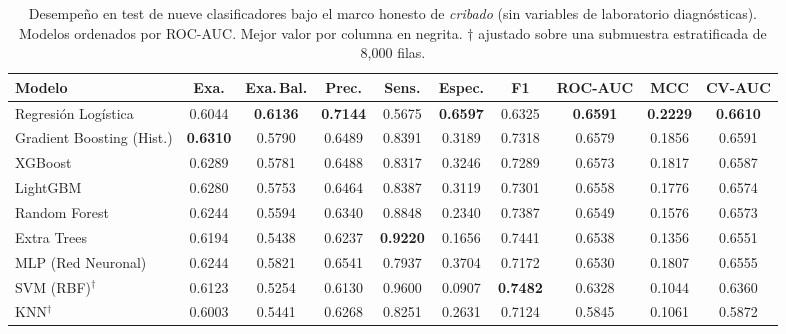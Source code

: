 \begin{table}[!t]
\renewcommand{\arraystretch}{1.25}
\caption{Desempeño en test de nueve clasificadores bajo el marco honesto de
\emph{cribado} (sin variables de laboratorio diagnósticas). Modelos ordenados
por ROC-AUC. Mejor valor por columna en negrita. $\dagger$ ajustado sobre una
submuestra estratificada de 8{,}000 filas.}
\label{tab:comparison}
\centering
\begin{tabular}{l c c c c c c c c c}
\toprule
\textbf{Modelo} & \textbf{Exa.} & \textbf{Exa.\,Bal.} & \textbf{Prec.} & \textbf{Sens.} & \textbf{Espec.} & \textbf{F1} & \textbf{ROC-AUC} & \textbf{MCC} & \textbf{CV-AUC} \\
\midrule
Regresión Logística        & 0.6044 & \textbf{0.6136} & \textbf{0.7144} & 0.5675 & \textbf{0.6597} & 0.6325 & \textbf{0.6591} & \textbf{0.2229} & \textbf{0.6610} \\
Gradient Boosting (Hist.)  & \textbf{0.6310} & 0.5790 & 0.6489 & 0.8391 & 0.3189 & 0.7318 & 0.6579 & 0.1856 & 0.6591 \\
XGBoost                    & 0.6289 & 0.5781 & 0.6488 & 0.8317 & 0.3246 & 0.7289 & 0.6573 & 0.1817 & 0.6587 \\
LightGBM                   & 0.6280 & 0.5753 & 0.6464 & 0.8387 & 0.3119 & 0.7301 & 0.6558 & 0.1776 & 0.6574 \\
Random Forest              & 0.6244 & 0.5594 & 0.6340 & 0.8848 & 0.2340 & 0.7387 & 0.6549 & 0.1576 & 0.6573 \\
Extra Trees                & 0.6194 & 0.5438 & 0.6237 & \textbf{0.9220} & 0.1656 & 0.7441 & 0.6538 & 0.1356 & 0.6551 \\
MLP (Red Neuronal)         & 0.6244 & 0.5821 & 0.6541 & 0.7937 & 0.3704 & 0.7172 & 0.6530 & 0.1807 & 0.6555 \\
SVM (RBF)$^{\dagger}$      & 0.6123 & 0.5254 & 0.6130 & 0.9600 & 0.0907 & \textbf{0.7482} & 0.6328 & 0.1044 & 0.6360 \\
KNN$^{\dagger}$            & 0.6003 & 0.5441 & 0.6268 & 0.8251 & 0.2631 & 0.7124 & 0.5845 & 0.1061 & 0.5872 \\
\bottomrule
\end{tabular}
\end{table}
